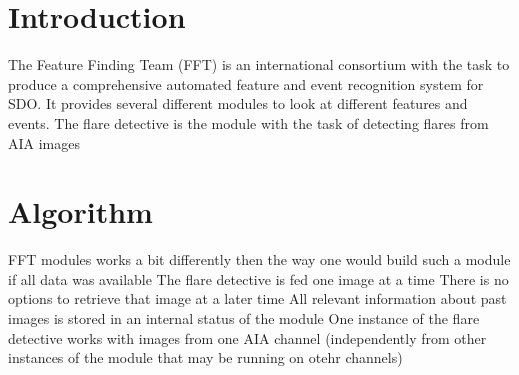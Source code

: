 
\pagestyle{fancy}%
\fancyhf{} %
\renewcommand{\chaptermark}[1]{%
         \markboth{#1}{}}
\renewcommand{\sectionmark}[1]{%
         \markright{\thesection\ #1}}
\fancyhead[LE,RO]{\bfseries\thepage}
\fancyhead[LO]{\bfseries\rightmark}
\fancyhead[RE]{\bfseries\leftmark}
\newpage%
\renewcommand{\headrulewidth}{0.5pt}
\renewcommand{\footrulewidth}{0.5pt}



\section{Introduction}
	The Feature Finding Team (FFT) is an international consortium with the task to produce a comprehensive automated feature and event recognition system for SDO.
It provides several different modules to look at different features and events.
The flare detective is the module with the  task of detecting flares from AIA images
	\subsection{}
	\subsubsection{}

\section{Algorithm}

FFT modules works a bit differently then the way one would build such a module if all data was available
The flare detective is fed one image at a time
There is no options to retrieve that image at a later time
All relevant information about past images is stored in an internal status of the module
One instance of the flare detective works with images from one AIA channel (independently from other instances of the module that may be running on otehr channels)

